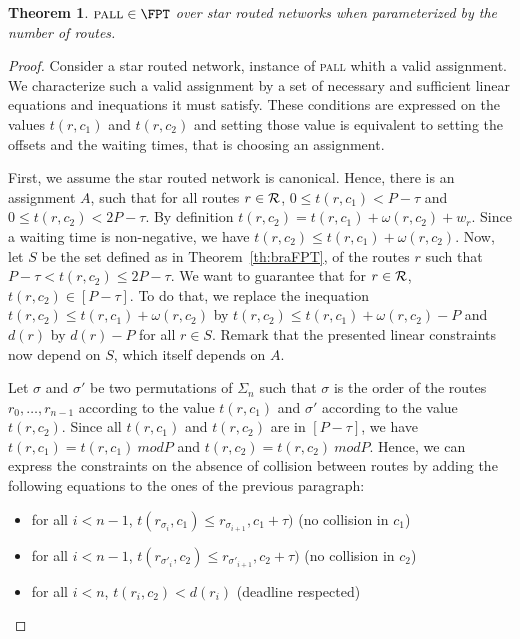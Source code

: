 \documentclass[a4paper,10pt]{article}
\newtheorem{theorem}{Theorem}
\newcommand\pall{\textsc{pall}\xspace}
\begin{document}
\begin{theorem}\label{th:pallFPT}
$\pall \in \FPT$ over star routed networks when parameterized by the number of routes.
\end{theorem}
\begin{proof}
 Consider a star routed network, instance of \pall whith a valid assignment. We characterize such a valid assignment by a set of necessary and sufficient linear equations and inequations it must satisfy.  These conditions are expressed on the values $t(r,c_1)$ and $t(r,c_2)$ and setting those value is equivalent to setting the offsets and the waiting times, that is choosing an assignment.

First, we assume the star routed network is canonical. Hence, there is an assignment $A$, such that for all routes $r \in \cal{R}$, $0 \leq t(r,c_1) < P -\tau$ and $0 \leq t(r,c_2) < 2P-\tau$. 
By definition $t(r,c_2) = t(r,c_1) + \omega(r,c_2) + w_r$. Since a waiting time is non-negative, we have $t(r,c_2) \leq t(r,c_1) + \omega(r,c_2)$. 
Now, let $S$ be the set defined as in Theorem~\ref{th:braFPT}, of the routes $r$ such that  $P - \tau < t(r,c_2) \leq 2P - \tau$. We want to guarantee that for $r \in \cal{R}$, $t(r,c_2) \in [P-\tau]$.
To do that, we replace the inequation $t(r,c_2) \leq t(r,c_1) + \omega(r,c_2)$ by $t(r,c_2) \leq t(r,c_1) + \omega(r,c_2) - P$ and $d(r)$ by $d(r) - P$ for all $r \in S$. Remark that the presented linear constraints now depend on $S$, which itself depends on $A$.

 Let $\sigma$ and $\sigma'$ be two permutations of $\Sigma_n$ such that $\sigma$ is the order 
 of the routes $r_0,\dots, r_{n-1}$ according to the value $t(r,c_1)$ and $\sigma'$ according to the value $t(r,c_2)$.  Since all $t(r,c_1)$ and $t(r,c_2)$ are in $[P-\tau]$, we have $t(r,c_1) = t(r,c_1) \ mod P $ and $t(r,c_2) = t(r,c_2) \ mod P $. Hence, we can express the constraints on the absence of collision between routes by adding the following equations to the ones of the previous paragraph:
 
 \begin{itemize}
 	\item for all $i < n-1$, $t(r_{\sigma_{i}},c_1) \leq r_{\sigma_{i+1}},c_1 + \tau)$ (no collision in $c_1$)
 	\item for all $i < n-1$, $t(r_{\sigma'_{i}},c_2) \leq r_{\sigma'_{i+1}},c_2 + \tau)$ (no collision in $c_2$)
 	\item for all $i < n$,  $t(r_{i},c_2) < d(r_i)$ (deadline respected)
 \end{itemize}


\end{proof}
\end{document}
